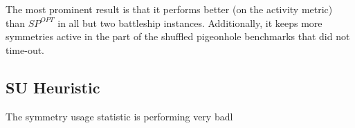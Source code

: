 	The most prominent result is that it performs better (on the activity metric) than $SP^{OPT}$ in
	all but two battleship instances.
	Additionally, it keeps more symmetries active in the part of the shuffled pigeonhole benchmarks
	that did not time-out.

\subsection{SU Heuristic}
	The symmetry usage statistic is performing very badl
